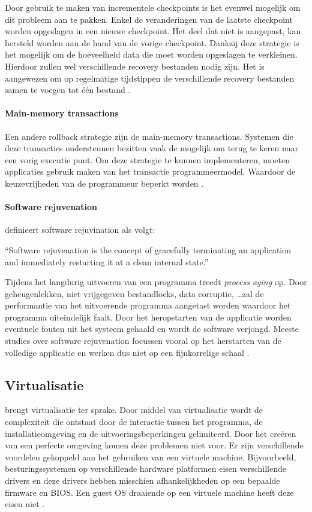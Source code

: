 Door gebruik te maken van incrementele checkpoints is het evenwel mogelijk om dit probleem aan te pakken.
Enkel de veranderingen van de laatste checkpoint worden opgeslagen in een nieuwe checkpoint.
Het deel dat niet is aangepast, kan hersteld worden aan de hand van de vorige checkpoint.
Dankzij deze strategie is het mogelijk om de hoeveelheid data die moet worden opgeslagen te verkleinen.
Hierdoor zullen wel verschillende recovery bestanden nodig zijn.
Het is aangewezen om op regelmatige tijdstippen de verschillende recovery bestanden samen te voegen tot één bestand \citep{plank1994libckpt, elnozahy2002survey}.

\paragraph{Main-memory transactions}
Een andere rollback strategie zijn de main-memory transactions.
Systemen die deze transacties ondersteunen bezitten vaak de mogelijk om terug te keren naar een vorig executie punt.
Om deze strategie te kunnen implementeren, moeten applicaties gebruik maken van het transactie programmeermodel.
Waardoor de keuzevrijheden van de programmeur beperkt worden \citep{srinivasan2004flashback}.

\paragraph{Software rejuvenation}
\citet{huang1995software} definieert software rejuvination als volgt:
\begin{displayquote}
``Software rejuvenation is the concept of gracefully terminating an application and immediately restarting it at a clean internal state.''
\end{displayquote}
Tijdens het langdurig uitvoeren van een programma treedt \emph{process aging} op.
Door geheugenlekken, niet vrijgegeven bestandlocks, data corruptie, \ldots zal de performantie van het uitvoerende programma aangetast worden waardoor het programma uiteindelijk faalt.
Door het heropstarten van de applicatie worden eventuele fouten uit het systeem gehaald en wordt de software verjongd.
Meeste studies over software rejuvenation focussen vooral op het herstarten van de volledige applicatie en werken dus niet op een fijnkorrelige schaal \citep{srinivasan2004flashback}.

\subsection{Virtualisatie}\label{sec:virtualisatie}
\citet{softwareDeployment} brengt virtualisatie ter sprake.
Door middel van virtualisatie wordt de complexiteit die ontstaat door de interactie tussen het programma, de installatieomgeving en de uitvoeringsbeperkingen gelimiteerd.
Door het creëren van een perfecte omgeving komen deze problemen niet voor.
Er zijn verschillende voordelen gekoppeld aan het gebruiken van een virtuele machine.
Bijvoorbeeld, besturingssystemen op verschillende hardware platformen eisen verschillende drivers en deze drivers hebben misschien afhankelijkheden op een bepaalde firmware en BIOS.
Een guest OS draaiende op een virtuele machine heeft deze eisen niet \citep{shumate2004implications}.

